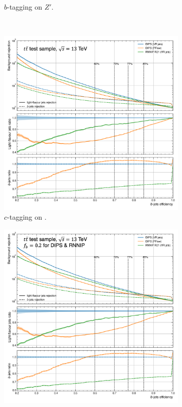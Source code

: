 \begin{figure}[h!]
\begin{subfigure}[t]{0.48\textwidth}
    \caption{$b$-tagging on $Z'$.}
    \label{fig:dipsVRROCzp}
  \end{subfigure} \\
  \begin{subfigure}[t]{0.48\textwidth}
    \centering
    \includegraphics[width=\textwidth]{Images/FTAG/VRDips/ROC/ttc.png}
    \caption{$c$-tagging on \ttb.}
    \label{fig:dipsVRROCttc}
  \end{subfigure}
  \begin{subfigure}[t]{0.48\textwidth}
    \centering
    \includegraphics[width=\textwidth]{Images/FTAG/VRDips/ROC/zpc.png}

\end{subfigure}
\end{figure}
